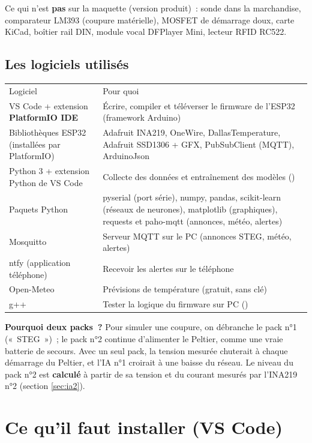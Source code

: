 {\small Ce qui n'est \textbf{pas} sur la maquette (version produit)~: sonde dans la marchandise, comparateur LM393 (coupure matérielle), MOSFET de démarrage doux, carte KiCad, boîtier rail DIN, module vocal DFPlayer Mini, lecteur RFID RC522.}

\subsection{Les logiciels utilisés}
\begin{tabularx}{\linewidth}{P{4.6cm}L}
 Logiciel & \mdseries Pour quoi \\
VS Code + extension \textbf{PlatformIO IDE} & Écrire, compiler et téléverser le firmware de l'ESP32 (framework Arduino) \\
Bibliothèques ESP32 (installées par PlatformIO) & Adafruit INA219, OneWire, DallasTemperature, Adafruit SSD1306 + GFX, PubSubClient (MQTT), ArduinoJson \\
Python 3 + extension Python de VS Code & Collecte des données et entraînement des modèles () \\
Paquets Python & pyserial (port série), numpy, pandas, scikit-learn (réseaux de neurones), matplotlib (graphiques), requests et paho-mqtt (annonces, météo, alertes) \\
Mosquitto & Serveur MQTT sur le PC (annonces STEG, météo, alertes) \\
ntfy (application téléphone) & Recevoir les alertes sur le téléphone \\
Open-Meteo & Prévisions de température (gratuit, sans clé) \\
g++ & Tester la logique du firmware sur PC () \\
\end{tabularx}

\textbf{Pourquoi deux packs~?} Pour simuler une coupure, on débranche le pack n°1 («~STEG~»)~; le pack n°2 continue d'alimenter le Peltier, comme une vraie batterie de secours. Avec un seul pack, la tension mesurée chuterait à chaque démarrage du Peltier, et l'IA n°1 croirait à une baisse du réseau. Le niveau du pack n°2 est \textbf{calculé} à partir de sa tension et du courant mesurés par l'INA219 n°2 (section \ref{sec:ia2}).

\section{Ce qu'il faut installer (VS Code)}\label{sec:install}

